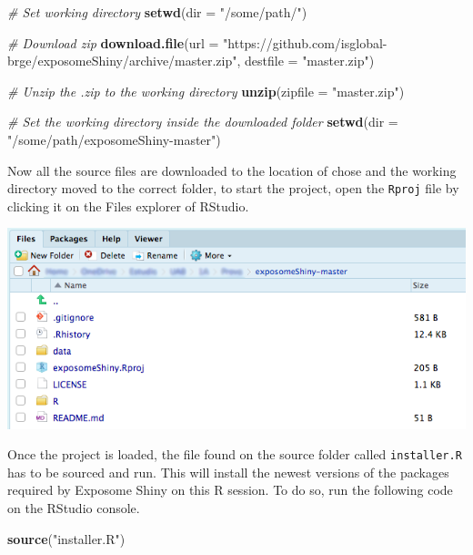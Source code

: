 \documentclass[
]{book}
\newenvironment{Shaded}{\begin{snugshade}}{\end{snugshade}}
\newcommand{\CommentTok}[1]{\textcolor[rgb]{0.56,0.35,0.01}{\textit{#1}}}
\newcommand{\DataTypeTok}[1]{\textcolor[rgb]{0.13,0.29,0.53}{#1}}
\newcommand{\KeywordTok}[1]{\textcolor[rgb]{0.13,0.29,0.53}{\textbf{#1}}}
\newcommand{\NormalTok}[1]{#1}
\newcommand{\StringTok}[1]{\textcolor[rgb]{0.31,0.60,0.02}{#1}}
\begin{document}
\begin{Shaded}
\begin{Highlighting}[]
  \CommentTok{# Set working directory}
\KeywordTok{setwd}\NormalTok{(}\DataTypeTok{dir =} \StringTok{"/some/path/"}\NormalTok{)}
      
  \CommentTok{# Download zip}
\KeywordTok{download.file}\NormalTok{(}\DataTypeTok{url =} \StringTok{"https://github.com/isglobal-brge/exposomeShiny/archive/master.zip"}\NormalTok{, }\DataTypeTok{destfile =} \StringTok{"master.zip"}\NormalTok{)}

  \CommentTok{# Unzip the .zip to the working directory}
\KeywordTok{unzip}\NormalTok{(}\DataTypeTok{zipfile =} \StringTok{"master.zip"}\NormalTok{)}

  \CommentTok{# Set the working directory inside the downloaded folder}
\KeywordTok{setwd}\NormalTok{(}\DataTypeTok{dir =} \StringTok{"/some/path/exposomeShiny-master"}\NormalTok{)}
\end{Highlighting}
\end{Shaded}

Now all the source files are downloaded to the location of chose and the working directory moved to the correct folder, to start the project, open the \texttt{Rproj} file by clicking it on the Files explorer of RStudio.

\includegraphics{images/setup1.png}

Once the project is loaded, the file found on the source folder called \texttt{installer.R} has to be sourced and run. This will install the newest versions of the packages required by Exposome Shiny on this R session. To do so, run the following code on the RStudio console.

\begin{Shaded}
\begin{Highlighting}[]
\KeywordTok{source}\NormalTok{(}\StringTok{"installer.R"}\NormalTok{)}
\end{Highlighting}
\end{Shaded}
\end{document}
